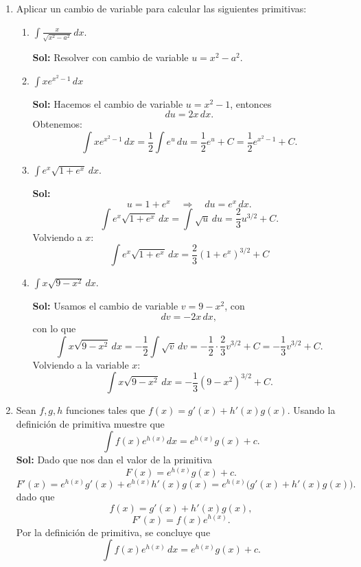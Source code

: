 \documentclass[letterpaper,12pt]{article}
\theoremstyle{plain}
\theoremstyle{definition}
\begin{document}
\begin{enumerate}
\item Aplicar un cambio de variable para calcular las siguientes primitivas:
\begin{enumerate}
    \item $\displaystyle \int \frac{x}{\sqrt{x^2 - a^2}} \, dx$.

    \color{blue}
    \textbf{Sol:} Resolver con cambio de variable $u=x^2-a^2$.
    \color{black}

\item $\displaystyle
\int x e^{x^2-1}\,dx
$

\color{blue}    
\textbf{Sol:} Hacemos el cambio de variable \(u=x^2-1\), entonces
\[
du=2x\,dx.
\]
Obtenemos:
\[
\int x e^{x^2-1}\,dx
= \frac{1}{2}\int e^{u}\,du
= \frac{1}{2}e^{u}+C
= \frac{1}{2}e^{x^2-1}+C.
\]
    \color{black}
    
    
    \item $\displaystyle \int e^x \sqrt{1 + e^x} \, dx$.

\color{blue}
    \textbf{Sol:} \[
u=1+e^x \quad\Rightarrow\quad du=e^x\,dx.
\]
\[
\int e^x \sqrt{1+e^x}\,dx
= \int \sqrt{u}\,du
= \frac{2}{3}u^{3/2}+C.
\]
Volviendo a \(x\):
\[
\displaystyle \int e^x \sqrt{1+e^x}\,dx
= \frac{2}{3}\left(1+e^x\right)^{3/2}+C
\]
    \color{black}
    
    \item $\displaystyle \int x\sqrt{9-x^2}\, dx$.

    \color{blue}
\textbf{Sol:} 
Usamos el cambio de variable \(v=9-x^2\), con
\[
dv=-2x\,dx,
\]
con lo que
\[
\int x\sqrt{9-x^2}\,dx
= -\frac{1}{2}\int \sqrt{v}\,dv
= -\frac{1}{2}\cdot \frac{2}{3}v^{3/2}+C
= -\frac{1}{3}v^{3/2}+C.
\]
Volviendo a la variable \(x\):
\[
\int x\sqrt{9-x^2}\,dx
= -\frac{1}{3}(9-x^2)^{3/2}+C.
\]

    \color{black}
    
\end{enumerate}
\item Sean $f, g, h$ funciones tales que $f(x) = g'(x) + h'(x)g(x)$. Usando la definición de primitiva muestre que
\[
\int f(x)e^{h(x)}dx = e^{h(x)}g(x) + c.
\]
\color{blue}
    \textbf{Sol:} Dado que nos dan el valor de la primitiva
\[
F(x)=e^{h(x)}g(x)+c.
\]
\[
F'(x)=e^{h(x)}g'(x)+e^{h(x)}h'(x)g(x)
     =e^{h(x)}\bigl(g'(x)+h'(x)g(x)\bigr).
\]
dado que
\[
f(x)=g'(x)+h'(x)g(x),
\]
\[
F'(x)=f(x)e^{h(x)}.
\]
Por la definición de primitiva, se concluye que
\[
\int f(x)e^{h(x)}\,dx = e^{h(x)}g(x)+c.
\]
    \color{black}


\end{enumerate}
\end{document}
